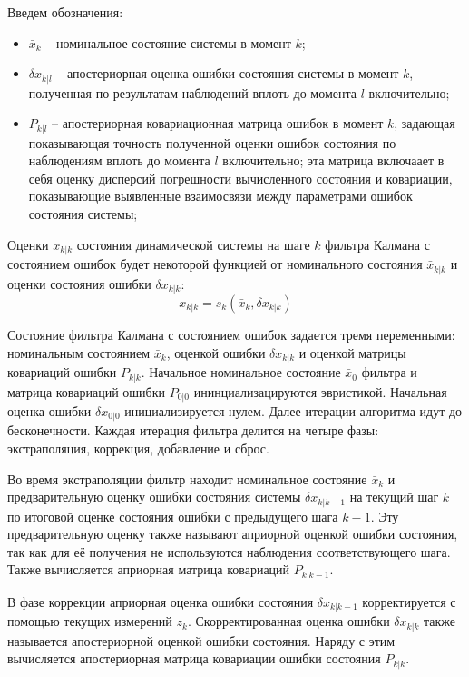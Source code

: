 \documentclass[12pt]{article}
\begin{document}
Введем обозначения:
\begin{itemize}
    \item[] $\bar{x}_k$ -- номинальное состояние системы в момент $k$;
    \item[] $\delta x_{k|l}$ -- апостериорная оценка ошибки состояния системы
          в момент $k$, полученная по результатам наблюдений вплоть до момента
          $l$ включительно;
    \item[] $P_{k|l}$ -- апостериорная ковариационная матрица ошибок в момент $k$,
          задающая  показывающая точность полученной оценки ошибок состояния по наблюдениям
          вплоть до момента $l$ включительно; эта матрица включаает в себя
          оценку дисперсий погрешности вычисленного состояния и ковариации,
          показывающие выявленные взаимосвязи между параметрами ошибок состояния системы;
\end{itemize}

Оценки $x_{k|k}$ состояния динамической системы на шаге $k$ фильтра
Калмана с состоянием ошибок будет некоторой функцией от номинального
состояния $\bar{x}_{k|k}$ и оценки состояния ошибки $\delta x_{k|k}$:
\begin{equation}
    x_{k|k}=s_k(\bar{x}_k, \delta x_{k|k})
\end{equation}

Состояние фильтра Калмана с состоянием ошибок задается тремя переменными:
номинальным состоянием $\bar{x}_{k}$, оценкой ошибки $\delta x_{k|k}$ и оценкой
матрицы ковариаций ошибки $P_{k|k}$. Начальное номинальное состояние $\bar{x}_0$
фильтра и матрица ковариаций ошибки $P_{0|0}$ ининциализацируются эвристикой.
Начальная оценка ошибки $\delta x_{0|0}$ инициализируется
нулем. Далее итерации алгоритма идут до бесконечности. Каждая итерация фильтра
делится на четыре фазы: экстраполяция, коррекция, добавление и сброс.

Во время экстраполяции фильтр находит номинальное состояние $\bar{x}_k$ и
предварительную оценку ошибки состояния системы $\delta x_{k|k-1}$ на текущий
шаг $k$ по итоговой оценке состояния ошибки с предыдущего шага $k-1$. Эту
предварительную оценку также называют априорной оценкой ошибки состояния,
так как для её получения не используются наблюдения соответствующего шага.
Также вычисляется априорная матрица ковариаций $P_{k|k-1}$.

В фазе коррекции априорная оценка ошибки состояния $\delta x_{k|k-1}$
корректируется с помощью текущих измерений $z_k$. Скорректированная оценка ошибки
$\delta x_{k|k}$ также называется апостериорной оценкой ошибки состояния. Наряду
с этим вычисляется апостериорная матрица ковариации ошибки состояния $P_{k|k}$.
\end{document}
